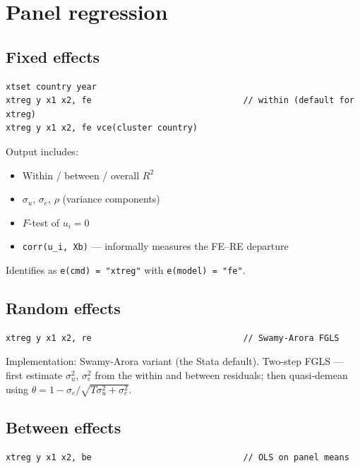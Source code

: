 \documentclass[11pt,letterpaper]{article}
\begin{document}
\section{Panel regression}

\subsection{Fixed effects}

\begin{lstlisting}
xtset country year
xtreg y x1 x2, fe                              // within (default for xtreg)
xtreg y x1 x2, fe vce(cluster country)
\end{lstlisting}

Output includes:
\begin{itemize}
\item Within / between / overall $R^2$
\item $\sigma_u$, $\sigma_e$, $\rho$ (variance components)
\item $F$-test of $u_i = 0$
\item \texttt{corr(u\_i, Xb)} — informally measures the FE--RE departure
\end{itemize}

Identifies as \texttt{e(cmd) = "xtreg"} with \texttt{e(model) = "fe"}.

\subsection{Random effects}

\begin{lstlisting}
xtreg y x1 x2, re                              // Swamy-Arora FGLS
\end{lstlisting}

Implementation: Swamy-Arora variant (the Stata default).  Two-step
FGLS — first estimate $\sigma_u^2$, $\sigma_e^2$ from the within and
between residuals; then quasi-demean using
$\theta = 1 - \sigma_e / \sqrt{T \sigma_u^2 + \sigma_e^2}$.

\subsection{Between effects}

\begin{lstlisting}
xtreg y x1 x2, be                              // OLS on panel means
\end{lstlisting}
\end{document}
